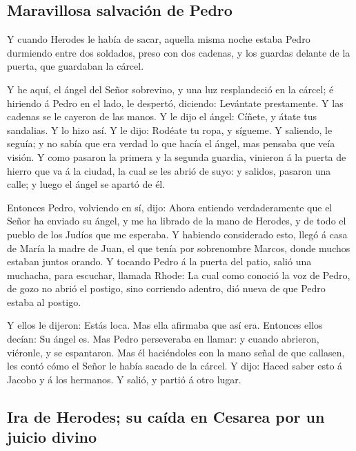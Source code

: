 \hypertarget{maravillosa-salvaciuxf3n-de-pedro}{%
\subsection{Maravillosa salvación de
Pedro}\label{maravillosa-salvaciuxf3n-de-pedro}}

 Y cuando Herodes le había de sacar, aquella misma noche
estaba Pedro durmiendo entre dos soldados, preso con dos cadenas, y los
guardas delante de la puerta, que guardaban la cárcel.

 Y he aquí, el ángel del Señor sobrevino, y una luz
resplandeció en la cárcel; é hiriendo á Pedro en el lado, le despertó,
diciendo: Levántate prestamente. Y las cadenas se le cayeron de las
manos.  Y le dijo el ángel: Cíñete, y átate tus sandalias. Y
lo hizo así. Y le dijo: Rodéate tu ropa, y sígueme.  Y
saliendo, le seguía; y no sabía que era verdad lo que hacía el ángel,
mas pensaba que veía visión.  Y como pasaron la primera y
la segunda guardia, vinieron á la puerta de hierro que va á la ciudad,
la cual se les abrió de suyo: y salidos, pasaron una calle; y luego el
ángel se apartó de él.

 Entonces Pedro, volviendo en sí, dijo: Ahora entiendo
verdaderamente que el Señor ha enviado su ángel, y me ha librado de la
mano de Herodes, y de todo el pueblo de los Judíos que me esperaba.
 Y habiendo considerado esto, llegó á casa de María la
madre de Juan, el que tenía por sobrenombre Marcos, donde muchos estaban
juntos orando.  Y tocando Pedro á la puerta del patio,
salió una muchacha, para escuchar, llamada Rhode:  La cual
como conoció la voz de Pedro, de gozo no abrió el postigo, sino
corriendo adentro, dió nueva de que Pedro estaba al postigo.

 Y ellos le dijeron: Estás loca. Mas ella afirmaba que así
era. Entonces ellos decían: Su ángel es.  Mas Pedro
perseveraba en llamar: y cuando abrieron, viéronle, y se espantaron.
 Mas él haciéndoles con la mano señal de que callasen, les
contó cómo el Señor le había sacado de la cárcel. Y dijo: Haced saber
esto á Jacobo y á los hermanos. Y salió, y partió á otro lugar.

\hypertarget{ira-de-herodes-su-cauxedda-en-cesarea-por-un-juicio-divino}{%
\subsection{Ira de Herodes; su caída en Cesarea por un juicio
divino}\label{ira-de-herodes-su-cauxedda-en-cesarea-por-un-juicio-divino}}


